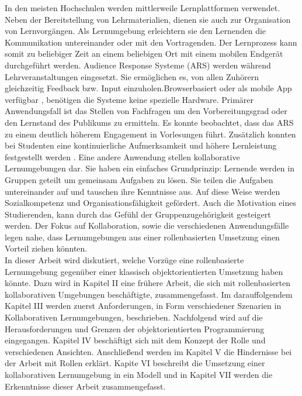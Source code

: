 \documentclass[conference]{IEEEtran}
\begin{document}
In den meisten Hochschulen werden mittlerweile Lernplattformen verwendet. Neben der Bereitstellung von Lehrmaterialien, dienen sie auch zur Organisation von Lernvorgängen. Als Lernumgebung erleichtern sie den Lernenden die Kommunikation untereinander oder mit den Vortragenden. Der Lernprozess kann somit zu beliebiger Zeit an einem beliebigen Ort mit einem mobilen Endgerät durchgeführt werden. Audience Response Systeme (ARS) werden während Lehrveranstaltungen eingesetzt. Sie ermöglichen es, von allen Zuhörern gleichzeitig Feedback bzw. Input einzuholen.Browserbasiert oder als mobile App verfügbar , benötigen die Systeme keine spezielle Hardware. Primärer Anwendungsfall ist das Stellen von Fachfragen um den Vorbereitungsgrad oder den Lernstand des Publikums zu ermitteln. Es konnte beobachtet, dass das ARS zu einem deutlich höherem Engagement in Vorlesungen führt. Zusätzlich konnten bei Studenten eine kontinuierliche Aufmerksamkeit und höhere Lernleistung festgestellt werden \cite{digitaleHochschule}. Eine andere Anwendung stellen kollaborative Lernumgebungen dar. Sie haben ein einfaches Grundprinzip: Lernende werden in Gruppen geteilt um gemeinsam Aufgaben zu lösen. Sie teilen die Aufgaben untereinander auf und tauschen ihre Kenntnisse aus. Auf diese Weise werden Sozialkompetenz und Organisationsfähigkeit gefördert. Auch die Motivation eines Studierenden, kann durch das Gefühl der Gruppenzugehörigkeit gesteigert werden. Der Fokus auf Kollaboration, sowie die verschiedenen Anwendungsfälle legen nahe, dass Lernumgebungen aus einer rollenbasierten Umsetzung einen Vorteil ziehen könnten. \\ In dieser Arbeit wird diskutiert, welche Vorzüge eine rollenbasierte Lernumgebung gegenüber einer klassisch objektorientierten Umsetzung haben könnte. Dazu wird in Kapitel II eine frühere Arbeit, die sich mit rollenbasierten kollaborativen Umgebungen beschäftigte, zusammengefasst. Im darauffolgendem Kapitel III werden zuerst Anforderungen, in Form verschiedener Szenarien in Kollaborativen Lernumgebungen, beschrieben. Nachfolgend wird auf die Herausforderungen und Grenzen der objektorientierten Programmierung eingegangen. Kapitel IV beschäftigt sich mit dem Konzept der Rolle und verschiedenen Ansichten. Anschließend werden im Kapitel V die Hindernisse bei der Arbeit mit Rollen erklärt. Kapite VI beschreibt die Umsetzung einer kollaborativen Lernumgebung in ein Modell und in Kapitel VII werden die Erkenntnisse dieser Arbeit zusammengefasst.
\end{document}
